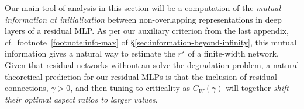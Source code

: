 Our main tool of analysis in this section will be a computation of the \emph{mutual information at initialization} between non-overlapping representations in deep layers of a residual MLP. 
As per our auxiliary  criterion from the last appendix, cf.~footnote~\ref{footnote:info-max} of
\S\ref{sec:information-beyond-infinity},
this mutual information gives a natural way to estimate the  $r^\star$ of a finite-width network.
Given that residual networks  without an  solve the degradation problem, a natural theoretical prediction for our residual MLPs is that
the inclusion of residual connections, $\gamma > 0$, and then tuning to criticality as $C_W(\gamma)$ will together \emph{shift their optimal aspect ratios to larger values}.



















